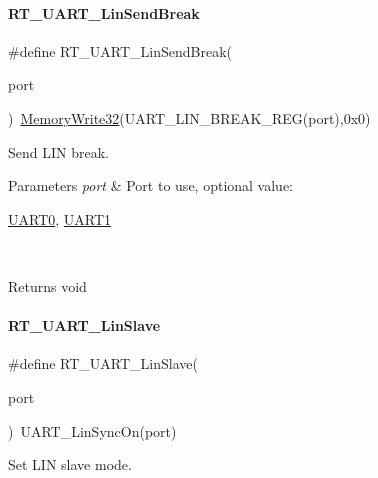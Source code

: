 \paragraph{\texorpdfstring{R\+T\+\_\+\+U\+A\+R\+T\+\_\+\+Lin\+Send\+Break}{RT\_UART\_LinSendBreak}}
{\footnotesize\ttfamily \#define R\+T\+\_\+\+U\+A\+R\+T\+\_\+\+Lin\+Send\+Break(\begin{DoxyParamCaption}\item[{}]{port }\end{DoxyParamCaption})~\mbox{\hyperlink{a00068_a6b9732365b12e48ddb89fe1028b975b0}{Memory\+Write32}}(U\+A\+R\+T\+\_\+\+L\+I\+N\+\_\+\+B\+R\+E\+A\+K\+\_\+\+R\+EG(port),0x0)}



Send L\+IN break. 


\begin{DoxyParams}{Parameters}
{\em port} & Port to use, optional value\+:
\begin{DoxyCode}
\mbox{\hyperlink{a00173_a0508661f121639ffdee7de2353a0def2}{UART0}}, \mbox{\hyperlink{a00173_a8d69bf04d07af4fbbab5a8bd291f65ff}{UART1}}
\end{DoxyCode}
 \\
\hline
\end{DoxyParams}
\begin{DoxyReturn}{Returns}
void 
\end{DoxyReturn}
\mbox{\label{a00173_a3f9518fa74ec401803fe1d15e0d39ff2}} 
\paragraph{\texorpdfstring{R\+T\+\_\+\+U\+A\+R\+T\+\_\+\+Lin\+Slave}{RT\_UART\_LinSlave}}
{\footnotesize\ttfamily \#define R\+T\+\_\+\+U\+A\+R\+T\+\_\+\+Lin\+Slave(\begin{DoxyParamCaption}\item[{}]{port }\end{DoxyParamCaption})~U\+A\+R\+T\+\_\+\+Lin\+Sync\+On(port)}



Set L\+IN slave mode. 


